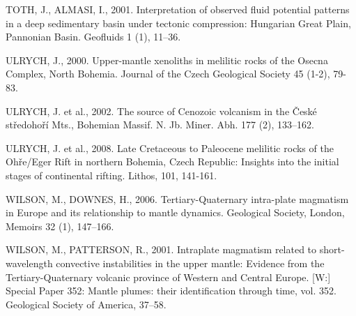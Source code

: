 \documentclass[11.5pt,twoside]{report}
\begin{document}
\begin{multicols}{3}
\uppercase{Toth, J., Almasi, I.}, 2001. Interpretation of observed fluid potential patterns in a deep sedimentary basin under tectonic compression: Hungarian Great Plain, Pannonian Basin. Geofluids 1 (1), 11–36. 

\uppercase{Ulrych, J.}, 2000. Upper-mantle xenoliths in melilitic rocks of the Osecna Complex, North Bohemia. Journal of the Czech Geological Society 45 (1-2), 79-83.

\uppercase{Ulrych, J.} et al., 2002. The source of Cenozoic volcanism in the České středohoří Mts., Bohemian Massif. N. Jb. Miner. Abh. 177 (2), 133–162. 

\uppercase{Ulrych, J.} et al., 2008. Late Cretaceous to Paleocene melilitic rocks of the Ohře/Eger Rift in northern Bohemia, Czech Republic: Insights into the initial stages of continental rifting. Lithos, 101, 141-161.

\uppercase{Wilson, M., Downes, H.}, 2006. Tertiary-Quaternary intra-plate magmatism in Europe and its relationship to mantle dynamics. Geological Society, London, Memoirs 32 (1), 147–166.

\uppercase{Wilson, M., Patterson, R.}, 2001. Intraplate magmatism related to short-wavelength convective instabilities in the upper mantle: Evidence from the Tertiary-Quaternary volcanic province of Western and Central Europe. [W:] Special Paper 352: Mantle plumes: their identification through time, vol. 352. Geological Society of America, 37–58.

\endgroup

\end{multicols}
\end{document}
